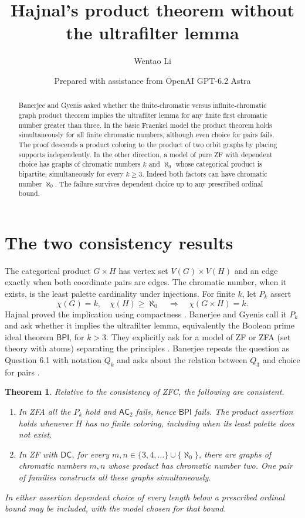 \documentclass[11pt]{article}
\title{Hajnal's product theorem without the ultrafilter lemma}
\author{Wentao Li}
\date{\small Prepared with assistance from OpenAI GPT-6.2 Astra}
\newtheorem{theorem}{Theorem}
\newcommand{\BPI}{\mathsf{BPI}}
\newcommand{\DC}{\mathsf{DC}}
\newcommand{\AC}{\mathsf{AC}}
\begin{document}
\maketitle
\begin{abstract}
Banerjee and Gyenis asked whether the finite-chromatic versus infinite-chromatic graph product theorem implies the ultrafilter lemma for any finite first chromatic number greater than three. In the basic Fraenkel model the product theorem holds simultaneously for all finite chromatic numbers, although even choice for pairs fails. The proof descends a product coloring to the product of two orbit graphs by placing supports independently. In the other direction, a model of pure ZF with dependent choice has graphs of chromatic numbers $k$ and $\aleph_0$ whose categorical product is bipartite, simultaneously for every $k\ge3$. Indeed both factors can have chromatic number $\aleph_0$. The failure survives dependent choice up to any prescribed ordinal bound.
\end{abstract}

\section{The two consistency results}
The categorical product $G\times H$ has vertex set $V(G)\times V(H)$ and an edge exactly when both coordinate pairs are edges. The chromatic number, when it exists, is the least palette cardinality under injections. For finite $k$, let $P_k$ assert
\[
 \chi(G)=k,\quad \chi(H)\ge\aleph_0\quad\Longrightarrow\quad\chi(G\times H)=k.
\]
Hajnal proved the implication using compactness \cite{haj}. Banerjee and Gyenis call it $P_k$ and ask whether it implies the ultrafilter lemma, equivalently the Boolean prime ideal theorem $\BPI$, for $k>3$. They explicitly ask for a model of ZF or ZFA (set theory with atoms) separating the principles \cite[Question 5.2]{bg}. Banerjee repeats the question as Question 6.1 with notation $Q_k$ and asks about the relation between $Q_3$ and choice for pairs \cite[Question 6.2]{b}.

\begin{theorem}\label{main}
Relative to the consistency of ZFC, the following are consistent.
\begin{enumerate}
\item In ZFA all the $P_k$ hold and $\AC_2$ fails, hence $\BPI$ fails. The product assertion holds whenever $H$ has no finite coloring, including when its least palette does not exist.
\item In ZF with $\DC$, for every $m,n\in\{3,4,\ldots\}\cup\{\aleph_0\}$, there are graphs of chromatic numbers $m,n$ whose product has chromatic number two. One pair of families constructs all these graphs simultaneously.
\end{enumerate}
In either assertion dependent choice of every length below a prescribed ordinal bound may be included, with the model chosen for that bound.
\end{theorem}
\end{document}
